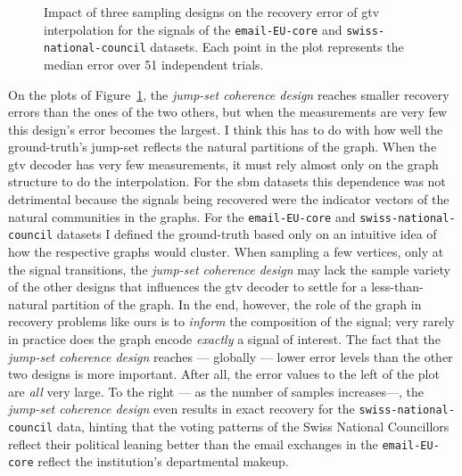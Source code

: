 \begin{figure}[H]
    \centering
    \hfill
    \caption[Three sampling designs: \texttt{email-EU-core} and \texttt{swiss-national-council}]{Impact of three sampling designs on the recovery error of \acrshort{gtv} interpolation for the signals of the \texttt{email-EU-core} and \texttt{swiss-national-council} datasets. Each point in the plot represents the median error over 51 independent trials.}
    \label{fig:pt_email_snc_tv_interp}
\end{figure}
\clearpage

On the plots of Figure~\ref{fig:pt_email_snc_tv_interp}, the \emph{jump-set coherence design} reaches smaller recovery errors than the ones of the two others, but when the measurements are very few this design's error becomes the largest. I think this has to do with how well the ground-truth's jump-set reflects the natural partitions of the graph. When the \acrshort{gtv} decoder has very few measurements, it must rely almost only on the graph structure to do the interpolation. For the \acrshort{sbm} datasets this dependence was not detrimental because the signals being recovered were the indicator vectors of the natural communities in the graphs. For the \texttt{email-EU-core} and \texttt{swiss-national-council} datasets I defined the ground-truth based only on an intuitive idea of how the respective graphs would cluster. When sampling a few vertices, only at the signal transitions, the \emph{jump-set coherence design} may lack the sample variety of the other designs that influences the \acrshort{gtv} decoder to settle for a less-than-natural partition of the graph. In the end, however, the role of the graph in recovery problems like ours is to \emph{inform} the composition of the signal; very rarely in practice does the graph encode \emph{exactly} a signal of interest. The fact that the \emph{jump-set coherence design} reaches --- globally --- lower error levels than the other two designs is more important. After all, the error values to the left of the plot are \emph{all} very large. To the right --- as the number of samples increases---, the \emph{jump-set coherence design} even results in exact recovery for the \texttt{swiss-national-council} data, hinting that the voting patterns of the Swiss National Councillors reflect their political leaning better than the email exchanges in the \texttt{email-EU-core} reflect the institution's departmental makeup.

